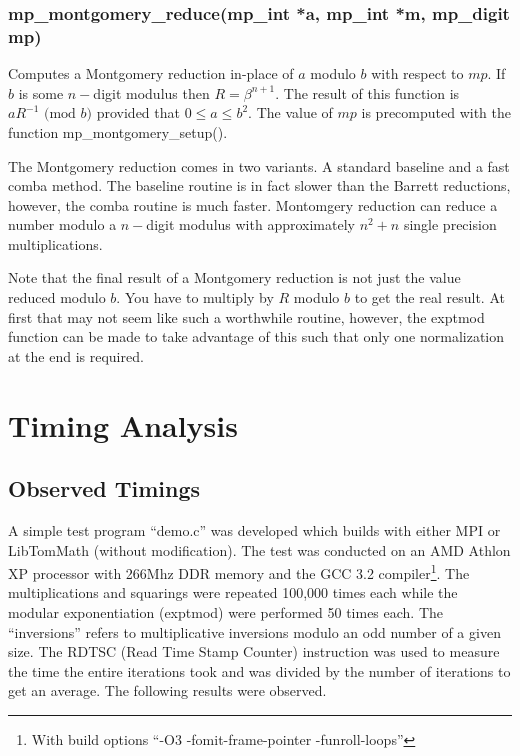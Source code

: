 \documentclass{article}
\begin{document}
\subsubsection{mp\_montgomery\_reduce(mp\_int *a, mp\_int *m, mp\_digit mp)}
Computes a Montgomery reduction in-place of $a$ modulo $b$ with respect to $mp$.  If $b$ is some $n-$digit modulus then
$R = \beta^{n+1}$.  The result of this function is $aR^{-1} \mbox{ (mod }b\mbox{)}$ provided that $0 \le a \le b^2$.
The value of $mp$ is precomputed with the function mp\_montgomery\_setup().

The Montgomery reduction comes in two variants.  A standard baseline and a fast comba method.  The baseline routine
is in fact slower than the Barrett reductions, however, the comba routine is much faster.  Montomgery reduction can 
reduce a number modulo a $n-$digit modulus with approximately $n^2 + n$ single precision multiplications.  

Note that the final result of a Montgomery reduction is not just the value reduced modulo $b$.  You have to multiply
by $R$ modulo $b$ to get the real result.  At first that may not seem like such a worthwhile routine, however, the
exptmod function can be made to take advantage of this such that only one normalization at the end is required.  

\section{Timing Analysis}
\subsection{Observed Timings}
A simple test program ``demo.c'' was developed which builds with either MPI or LibTomMath (without modification).  The
test was conducted on an AMD Athlon XP processor with 266Mhz DDR memory and the GCC 3.2 compiler\footnote{With build
options ``-O3 -fomit-frame-pointer -funroll-loops''}.    The multiplications and squarings were repeated 100,000 times 
each while the modular exponentiation (exptmod) were performed 50 times each.  The ``inversions'' refers to multiplicative
inversions modulo an odd number of a given size.  The RDTSC (Read Time Stamp Counter) instruction was used to measure the 
time the entire iterations took and was divided by the number of iterations to get an average.  The following results 
were observed.
\end{document}
